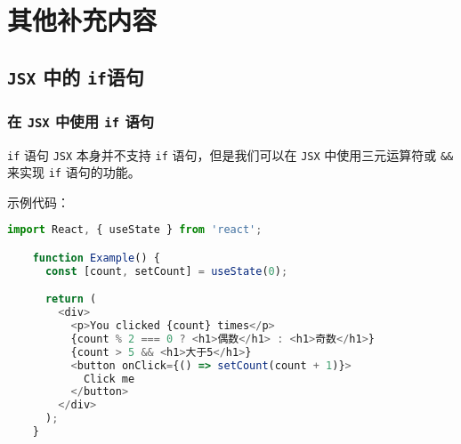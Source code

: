\documentclass{beamer}
\begin{document}
\section{其他补充内容}
\subsection{\texttt{JSX} 中的 \texttt{if}语句}
\begin{frame}
  \frametitle{在 \texttt{JSX} 中使用 \texttt{if} 语句}

  \begin{block}{\texttt{if} 语句}
    \texttt{JSX} 本身并不支持 \texttt{if} 语句，但是我们可以在 \texttt{JSX} 中使用三元运算符或 \texttt{\&\&} 来实现 \texttt{if} 语句的功能。
  \end{block}

  \framebreak

  示例代码：

  \begin{lstlisting}[language=JavaScript]
    import React, { useState } from 'react';

    function Example() {
      const [count, setCount] = useState(0);

      return (
        <div>
          <p>You clicked {count} times</p>
          {count % 2 === 0 ? <h1>偶数</h1> : <h1>奇数</h1>}
          {count > 5 && <h1>大于5</h1>}
          <button onClick={() => setCount(count + 1)}>
            Click me
          </button>
        </div>
      );
    }
  \end{lstlisting}

\end{frame}
\end{document}
